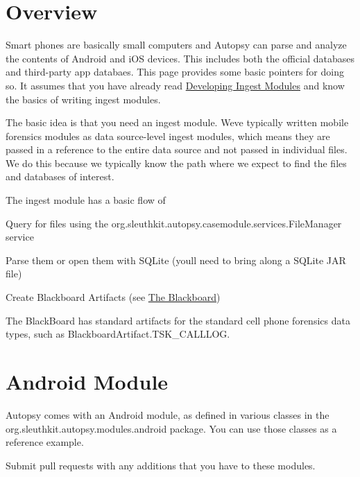 \hypertarget{mod_mobile_page_mod_mobile_overview}{}\section{Overview}\label{mod_mobile_page_mod_mobile_overview}
Smart phones are basically small computers and Autopsy can parse and analyze the contents of Android and i\+OS devices. This includes both the official databases and third-\/party app databaes. This page provides some basic pointers for doing so. It assumes that you have already read \hyperlink{mod_ingest_page}{Developing Ingest Modules} and know the basics of writing ingest modules.

The basic idea is that you need an ingest module. We\textquotesingle{}ve typically written mobile forensics modules as data source-\/level ingest modules, which means they are passed in a reference to the entire data source and not passed in individual files. We do this because we typically know the path where we expect to find the files and databases of interest.

The ingest module has a basic flow of
\begin{DoxyItemize}
\item Query for files using the org.\+sleuthkit.\+autopsy.\+casemodule.\+services.\+File\+Manager service
\item Parse them or open them with S\+Q\+Lite (you\textquotesingle{}ll need to bring along a S\+Q\+Lite J\+AR file)
\item Create Blackboard Artifacts (see \hyperlink{platform_page_platform_blackboard}{The Blackboard})
\end{DoxyItemize}

The Black\+Board has standard artifacts for the standard cell phone forensics data types, such as Blackboard\+Artifact.\+T\+S\+K\+\_\+\+C\+A\+L\+L\+L\+OG.\hypertarget{mod_mobile_page_mod_mobile_std}{}\section{Android Module}\label{mod_mobile_page_mod_mobile_std}
Autopsy comes with an Android module, as defined in various classes in the org.\+sleuthkit.\+autopsy.\+modules.\+android package. You can use those classes as a reference example.

Submit pull requests with any additions that you have to these modules. 